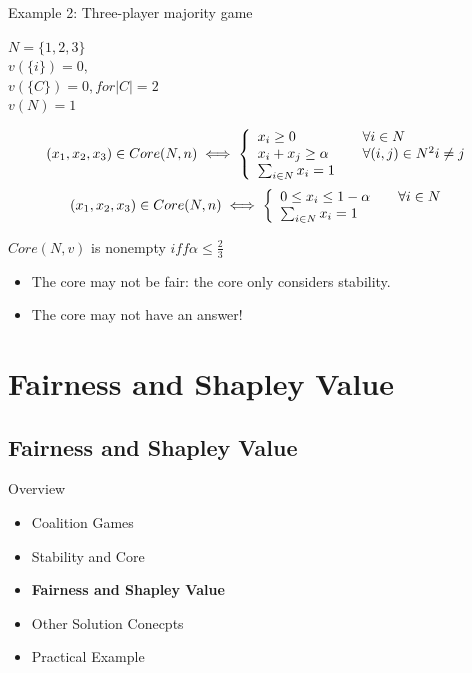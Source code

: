 \documentclass{beamer}
\begin{document}
\begin{frame} {Example 2: Three-player majority game}
    \begin{center}
      $N = \{1,2,3\}$ \\
      $v(\{i\}) = 0,$\\
      $v(\{C\}) = 0, for |C| = 2$ \\
      $v(N) = 1$ \\
    \end{center}
    \[ (x_1, x_2, x_3) \in Core(N,n) \iff \left\{
      \begin{array}{l l}
        x_i \geq 0 & \quad \forall i \in N\\
        x_i + x_j \geq \alpha & \quad \forall(i,j) \in N^2 i \neq j\\
        \sum_{i \in N} x_i = 1 &
      \end{array} \right.\]
    \[ (x_1, x_2, x_3) \in Core(N,n) \iff \left\{
      \begin{array}{l l}
        0 \leq x_i \leq 1 - \alpha & \quad \forall i \in N\\
        \sum_{i \in N} x_i = 1 &
      \end{array} \right.\]

    $Core(N,v)$ is nonempty $iff \alpha \leq \frac{2}{3}$ \\

    \begin{itemize}
        \item The core may not be fair: the core only considers stability. \\
        \item The core may not have an answer!
    \end{itemize}

\end{frame}
\section{Fairness and Shapley Value}
\subsection{Fairness and Shapley Value}

\begin{frame}{Overview}
    \begin{itemize}
     	\itemsep=.5cm
    	\item Coalition Games
    	\item Stability and Core
    	\item {\bf Fairness and Shapley Value}
    	\item Other Solution Conecpts
        \item Practical Example
    \end{itemize}
\end{frame}
\end{document}

